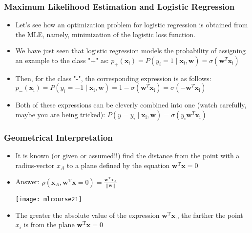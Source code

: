 \begin{frame}[fragile]\frametitle{Maximum Likelihood Estimation and Logistic Regression}
 \begin{itemize}

\item Let's see how an optimization problem for logistic regression is obtained from the MLE, namely, minimization of the logistic loss function. 
\item We have just seen that logistic regression models the probability of assigning an example to the class "+" as: $p_+(\textbf{x}_\text{i}) = P\left(y_i = 1 \mid \textbf{x}_\text{i}, \textbf{w}\right) = \sigma(\textbf{w}^T\textbf{x}_\text{i})$
\item Then, for the class "-", the corresponding expression is as follows:
$p_-(\textbf{x}_\text{i})  = P\left(y_i = -1 \mid \textbf{x}_\text{i}, \textbf{w}\right)  = 1 - \sigma(\textbf{w}^T\textbf{x}_\text{i}) = \sigma(-\textbf{w}^T\textbf{x}_\text{i})$

\item Both of these expressions can be cleverly combined into one (watch carefully, maybe you are being tricked): $P\left(y = y_i \mid \textbf{x}_\text{i}, \textbf{w}\right) = \sigma(y_i\textbf{w}^T\textbf{x}_\text{i})$
\end{itemize}

\end{frame}

\begin{frame}[fragile]\frametitle{Geometrical Interpretation}
 \begin{itemize}

\item It is known (or given or assumed!!) find the distance from the point with a radius-vector $x_A$ to a plane defined by the equation $\textbf{w}^\text{T}\textbf{x} = 0$

\item Answer: $\rho(\textbf{x}_A, \textbf{w}^\text{T}\textbf{x} = 0) = \frac{\textbf{w}^\text{T}\textbf{x}_A}{||\textbf{w}||}$


\begin{center}
\texttt{[image: mlcourse21]}
\end{center}

\item The greater the absolute value of the expression $\textbf{w}^\text{T}\textbf{x}_\text{i}$, the farther the point $x_i$ is from the plane $\textbf{w}^\text{T}\textbf{x} = 0$
\end{itemize}

\end{frame}



